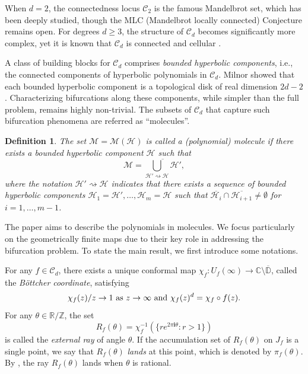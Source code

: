 \documentclass[a4paper,reqno,times, 11pt]{amsart}
\newtheorem{definition}[theorem]{Definition}
\theoremstyle{remark}
\theoremstyle{plain}
\numberwithin{equation}{section}
\def\MMMM{{\cal M}}
\def\MMMM{\mathscr M}
\def\HHHH{\mathscr H}
\def\CCCC{\mathscr C}
\def\R{\mbox{$\mathbb R$}}
\def\C{\mbox{$\mathbb C$}}
\def\D{\mathbb D}
\def\Z{\mbox{$\mathbb Z$}}
\def\cal{\mathcal}
\begin{document}
	When $d=2$, the connectedness locus $\CCCC_2$ is the famous Mandelbrot set, which has been deeply studied, though the MLC (Mandelbrot locally connected) Conjecture remains open. For degrees $d\geq3$, the structure of $\CCCC_d$ becomes significantly more complex, yet it is known that $\CCCC_d$ is connected and cellular \cite{BH,La}.
	
	A class of building blocks for $\CCCC_d$ comprises \emph{bounded hyperbolic components}, i.e., the connected components of hyperbolic polynomials
	in $\CCCC_d$.
	Milnor \cite{M2} showed that each bounded hyperbolic component is a topological disk of real dimension $2d-2$. Characterizing bifurcations along these components, while simpler than the full problem, remains highly non-trivial. The subsets of $\CCCC_d$ that capture such bifurcation phenomena are referred as ``molecules''.
	
	\begin{definition}
		The set $\MMMM=\MMMM(\HHHH)$ is called a  \emph{(polynomial) molecule} if there exists  a bounded hyperbolic component $\HHHH$ such that
		\[\MMMM=\overline{\bigcup_{\HHHH'\rightsquigarrow \HHHH} \HHHH'},\]
		where the notation $\HHHH'\rightsquigarrow\HHHH$ indicates that  there exists a  sequence of  bounded hyperbolic components $\HHHH_1=\HHHH', \ldots,\HHHH_m=\HHHH $ such that $\overline{\HHHH_i}\cap \overline{\HHHH_{i+1}}\not=\emptyset$ for $i=1,\ldots,m-1$.
	\end{definition}
	
	The paper aims to describe the polynomials in molecules.  We focus particularly on the geometrically finite maps
	due to their key role in addressing the bifurcation problem.
	To state the main result, we first introduce some  notations.
	
	For any $f\in\CCCC_d$, there exists a unique conformal map $\chi_f: U_f(\infty)\to \C\setminus\overline{\D}$, called the \emph{B\"{o}ttcher coordinate}, satisfying
	$$\chi_f(z)/z\to 1\textup{ as }z\to\infty\textup{ and }\chi_f(z)^d=\chi_f\circ f(z).$$
	For any $\theta\in \R/\Z$, the set
	\[R_f(\theta)=\chi^{-1}_f(\{re^{2\pi \textbf{i}\theta}:r>1\})\]
	is called the \emph{external ray} of angle $\theta$. If the accumulation set of $R_f(\theta)$ on $J_f$ is a single point, we say that $R_f(\theta)$ \emph{lands} at this point, which is denoted by $\pi_f(\theta)$.
	By \cite[Theorem 18.10]{Mil},  the ray $R_f(\theta)$ lands when $\theta$ is rational.
	
\end{document}
